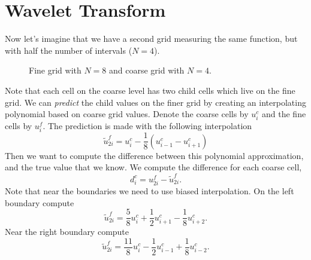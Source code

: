 \documentclass[10.5pt]{article}
\begin{document}
    \section{Wavelet Transform}
    Now let's imagine that we have a second grid measuring the same function,
    but with half the number of intervals ($N=4$).
    \begin{figure}[H]
        \center
        
        \caption{Fine grid with $N=8$ and coarse grid with $N=4$.}
    \end{figure}
    Note that each cell on the coarse level has two child cells which live on
    the fine grid. We can \textit{predict} the child values on the finer grid by
    creating an interpolating polynomial based on coarse grid values. Denote the
    coarse cells by $u_{i}^{c}$ and the fine cells by $u_{i}^{f}$. The
    prediction is made with the following interpolation
    \begin{equation}
        \tilde{u}^{f}_{2i} = u^{c}_{i} - \frac{1}{8} \left( u^{c}_{i-1} -
        u^{c}_{i+1} \right) 
    \end{equation}
    Then we want to compute the difference between this polynomial
    approximation, and the true value that we know. We compute the difference
    for each coarse cell,
    \begin{equation}
        d^{c}_{i} = u^{f}_{2i} - \tilde{u}^{f}_{2i}.
    \end{equation}
    Note that near the boundaries we need to use biased interpolation. On the
    left boundary compute
    \begin{equation}
        \tilde{u}^{f}_{2i} = \frac{5}{8} u^{c}_{i} + \frac{1}{2} u^{c}_{i+1}
        -\frac{1}{8} u^{c}_{i+2}.
    \end{equation}
    Near the right boundary compute
    \begin{equation}
        \tilde{u}^{f}_{2i} = \frac{11}{8} u^{c}_{i} - \frac{1}{2} u^{c}_{i-1}
        + \frac{1}{8} u^{c}_{i-2}.
    \end{equation}
\end{document}
